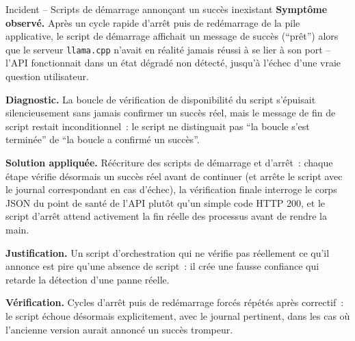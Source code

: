 \begin{probbox}{Incident -- Scripts de démarrage annonçant un succès inexistant}
\textbf{Symptôme observé.} Après un cycle rapide d'arrêt puis de redémarrage de la pile applicative, le script de démarrage affichait un message de succès (``prêt'') alors que le serveur \texttt{llama.cpp} n'avait en réalité jamais réussi à se lier à son port -- l'API fonctionnait dans un état dégradé non détecté, jusqu'à l'échec d'une vraie question utilisateur.

\textbf{Diagnostic.} La boucle de vérification de disponibilité du script s'épuisait silencieusement sans jamais confirmer un succès réel, mais le message de fin de script restait inconditionnel~: le script ne distinguait pas ``la boucle s'est terminée'' de ``la boucle a confirmé un succès''.

\textbf{Solution appliquée.} Réécriture des scripts de démarrage et d'arrêt~: chaque étape vérifie désormais un succès réel avant de continuer (et arrête le script avec le journal correspondant en cas d'échec), la vérification finale interroge le corps JSON du point de santé de l'API plutôt qu'un simple code HTTP 200, et le script d'arrêt attend activement la fin réelle des processus avant de rendre la main.

\textbf{Justification.} Un script d'orchestration qui ne vérifie pas réellement ce qu'il annonce est pire qu'une absence de script~: il crée une fausse confiance qui retarde la détection d'une panne réelle.

\textbf{Vérification.} Cycles d'arrêt puis de redémarrage forcés répétés après correctif~: le script échoue désormais explicitement, avec le journal pertinent, dans les cas où l'ancienne version aurait annoncé un succès trompeur.
\end{probbox}
